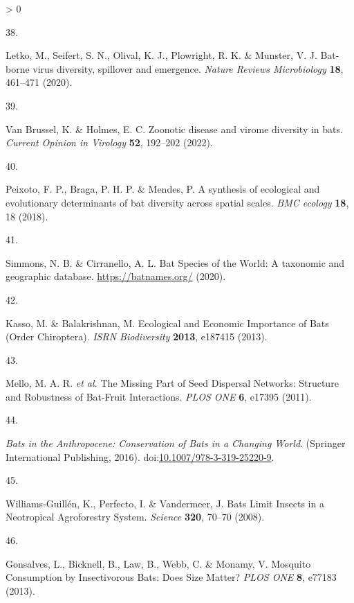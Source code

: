 \documentclass[11pt]{article}
\newlength{\cslhangindent}
\newlength{\csllabelwidth}
\newenvironment{CSLReferences}[3] %
 {%
  \setlength{\parindent}{0pt}
  \ifodd #1 \everypar{\setlength{\hangindent}{\cslhangindent}}\ignorespaces\fi
  \ifnum #2 > 0
  \setlength{\parskip}{#2\baselineskip}
  \fi
 }%
 {}
\newcommand{\CSLLeftMargin}[1]{\parbox[t]{\maxof{\widthof{#1}}{\csllabelwidth}}{#1}}
\newcommand{\CSLRightInline}[1]{\parbox[t]{\linewidth}{#1}}
\begin{document}
\begin{CSLReferences}{0}{0}
\leavevmode\hypertarget{ref-Letko2020BatVir}{}%
\CSLLeftMargin{38. }
\CSLRightInline{Letko, M., Seifert, S. N., Olival, K. J., Plowright, R.
K. \& Munster, V. J. Bat-borne virus diversity, spillover and emergence.
\emph{Nature Reviews Microbiology} \textbf{18}, 461--471 (2020).}

\leavevmode\hypertarget{ref-VanBrussel2022ZooDis}{}%
\CSLLeftMargin{39. }
\CSLRightInline{Van Brussel, K. \& Holmes, E. C. Zoonotic disease and
virome diversity in bats. \emph{Current Opinion in Virology}
\textbf{52}, 192--202 (2022).}

\leavevmode\hypertarget{ref-Peixoto2018SynEco}{}%
\CSLLeftMargin{40. }
\CSLRightInline{Peixoto, F. P., Braga, P. H. P. \& Mendes, P. A
synthesis of ecological and evolutionary determinants of bat diversity
across spatial scales. \emph{BMC ecology} \textbf{18}, 18 (2018).}

\leavevmode\hypertarget{ref-Simmons2020BatSpe}{}%
\CSLLeftMargin{41. }
\CSLRightInline{Simmons, N. B. \& Cirranello, A. L. Bat Species of the
World: A taxonomic and geographic database. \url{https://batnames.org/}
(2020).}

\leavevmode\hypertarget{ref-Kasso2013EcoEco}{}%
\CSLLeftMargin{42. }
\CSLRightInline{Kasso, M. \& Balakrishnan, M. Ecological and Economic
Importance of Bats (Order Chiroptera). \emph{ISRN Biodiversity}
\textbf{2013}, e187415 (2013).}

\leavevmode\hypertarget{ref-Mello2011MisPar}{}%
\CSLLeftMargin{43. }
\CSLRightInline{Mello, M. A. R. \emph{et al.} The Missing Part of Seed
Dispersal Networks: Structure and Robustness of Bat-Fruit Interactions.
\emph{PLOS ONE} \textbf{6}, e17395 (2011).}

\leavevmode\hypertarget{ref-Voigt2016BatAnt}{}%
\CSLLeftMargin{44. }
\CSLRightInline{\emph{Bats in the Anthropocene: Conservation of Bats in
a Changing World}. (Springer International Publishing, 2016).
doi:\href{https://doi.org/10.1007/978-3-319-25220-9}{10.1007/978-3-319-25220-9}.}

\leavevmode\hypertarget{ref-Williams-Guillen2008BatLim}{}%
\CSLLeftMargin{45. }
\CSLRightInline{Williams-Guillén, K., Perfecto, I. \& Vandermeer, J.
Bats Limit Insects in a Neotropical Agroforestry System. \emph{Science}
\textbf{320}, 70--70 (2008).}

\leavevmode\hypertarget{ref-Gonsalves2013MosCon}{}%
\CSLLeftMargin{46. }
\CSLRightInline{Gonsalves, L., Bicknell, B., Law, B., Webb, C. \&
Monamy, V. Mosquito Consumption by Insectivorous Bats: Does Size Matter?
\emph{PLOS ONE} \textbf{8}, e77183 (2013).}


\end{CSLReferences}
\end{document}
